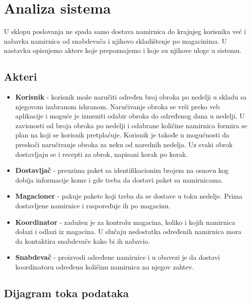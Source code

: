 
\section{Analiza sistema}

	U sklopu poslovanja ne spada samo dostava namirnica do krajnjeg korisnika već i nabavka namirnica od snabdevača i njihovo skladištenje po magacinima. U nastavku opisujemo aktere koje prepoznajemo i koje su njihove uloge u sistemu.
\subsection{Akteri}
	\begin{itemize}
		\item{\textbf{Korisnik}} - korisnik može naručiti određen broj obroka po nedelji u skladu sa njegovom izabranom ishranom. Naručivanje obroka se vrši preko veb aplikacije i moguće je izmeniti odabir obroka do određenog dana u nedelji. U zavisnosti od broja obroka po nedelji i odabrane količine namirnica formira se plan na koji se korisnik pretplaćuje. Korisnik je takođe u mogućnosti da preskoči naručivanje obroka za neku od narednih nedelja. Uz svaki obrok dostavljaju se i recepti za obrok, napisani korak po korak.
		\item{\textbf{Dostavljač}} - preuzima paket sa identifikacionim brojem na osnovu kog dobija informacije kome i gde treba da dostavi paket sa namirnicama.
		\item{\textbf{Magacioner}} - pakuje pakete koji treba da se dostave u toku nedelje. Prima dostavljene namirnice i raspoređuje ih po magacinu.
		\item{\textbf{Koordinator}} - zadužen je za kontrolu magacina, koliko i kojih namirnica dolazi i odlazi iz magacina. U slučaju nedostatka određenih namirnica mora da kontaktira snabdevače kako bi ih nabavio.
		\item{\textbf{Snabdevač}} - proizvodi određene namirnice i u obavezi je da dostavi koordinatoru određenu količinu namirnica na njegov zahtev.
	\end{itemize}
\subsection{Dijagram toka podataka}

